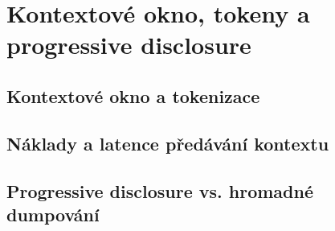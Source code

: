 \chapter{Kontextové okno, tokeny a progressive disclosure}
\label{ch:kontext-tokeny}

\section{Kontextové okno a tokenizace}

\section{Náklady a latence předávání kontextu}

\section{Progressive disclosure vs. hromadné dumpování}
